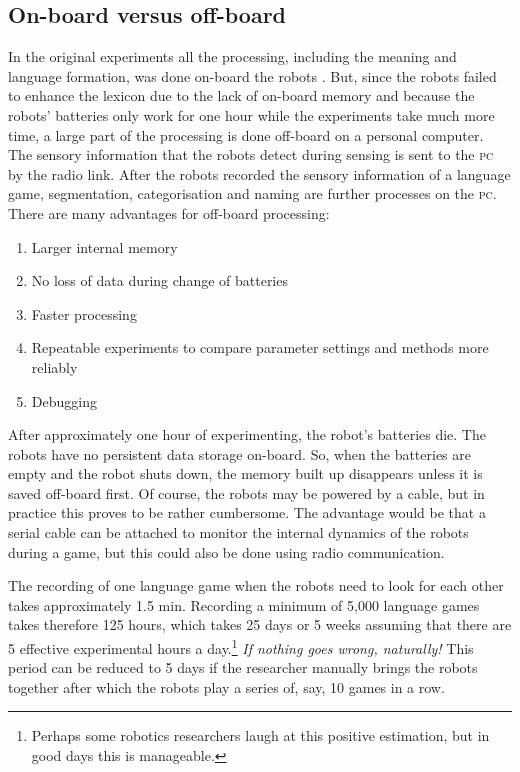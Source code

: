 \subsection{On-board versus off-board}\label{s:lg:offboard}

In the original experiments all the processing, including the meaning and language formation, was done on-board the robots \citep{steelsvogt:1997}. But, since the robots failed to enhance the lexicon due to the lack of on-board memory and because the robots' batteries only work for one hour while the experiments take much more time, a large part of the processing is done off-board on a personal computer. The sensory information that the robots detect during sensing is sent to the {\scshape pc} by the radio link. After the robots recorded the sensory information of a language game, segmentation, categorisation and naming are further processes on the {\scshape pc}. There are many advantages for off-board processing:

\begin{enumerate}
\item Larger internal memory
\item No loss of data during change of batteries
\item Faster processing
\item Repeatable experiments to compare parameter settings and methods more reliably
\item Debugging
\end{enumerate}


After approximately one hour of experimenting, the robot's batteries die. The robots have no persistent data storage on-board. So, when the batteries are empty and the robot shuts down, the memory built up disappears unless it is saved off-board first. Of course, the robots may be powered by a cable, but in practice this proves to be rather cumbersome. The advantage would be that a serial cable can be attached to monitor the internal dynamics of the robots during a game, but this could also be done using radio communication.

The recording of one language game when the robots need to look for each other takes approximately 1.5 min. Recording a minimum of 5,000 language games takes therefore 125 hours, which takes 25 days or 5 weeks assuming that there are 5 effective experimental hours a day.\footnote{Perhaps some robotics researchers laugh at this positive estimation, but in good days this is manageable.} {\em If nothing goes wrong, naturally!} This period can be reduced to 5 days if the researcher manually brings the robots together after which the robots play a series of, say, 10 games in a row. 

